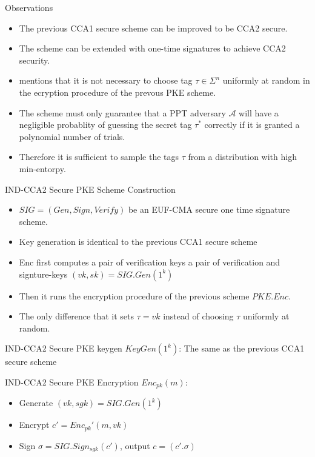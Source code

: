 \documentclass{beamer}
\begin{document}
\begin{frame}{Observations}
  \begin{itemize}
    \item The previous CCA1 secure scheme can be improved to be CCA2 secure.
    \item The scheme can be extended with one-time signatures to achieve CCA2 security.
    \item \cite{CCA} mentions that it is not necessary to choose tag $\tau \in \Sigma^n$ uniformly at random in the ecryption procedure of the prevous PKE scheme.
    \item The scheme must only guarantee that a PPT adversary $\mathcal{A}$ will have a negligible probablity of guessing the secret tag $\tau^*$ correctly if it is granted a polynomial number of trials.
    \item Therefore it is sufficient to sample the tags $\tau$ from a distribution with high min-entorpy.
  \end{itemize}

\end{frame}

\begin{frame}{IND-CCA2 Secure PKE Scheme Construction}
  \begin{itemize}
    \item $SIG = (Gen, Sign, Verify)$ be an EUF-CMA secure one time signature scheme.
    \item Key generation is identical to the previous CCA1 secure scheme
    \item Enc first computes a pair of verification keys a pair of verification and signture-keys $(vk, sk) = SIG.Gen(1^k)$
    \item Then it runs the encryption procedure of the previous scheme $PKE.Enc$.
    \item The only difference that it sets $\tau = vk$ instead of choosing $\tau$ uniformly at random.
  \end{itemize}
\end{frame}

\begin{frame}{IND-CCA2 Secure PKE keygen}
  $KeyGen(1^k)$:
  The same as the previous CCA1 secure scheme
\end{frame}

\begin{frame}{IND-CCA2 Secure PKE Encryption}
  $Enc_{pk}(m)$:
  \begin{itemize}
    \item Generate $(vk, sgk) = SIG.Gen(1^k)$
    \item Encrypt $c' = Enc_{pk}'(m, vk)$
    \item Sign $\sigma = SIG.Sign_{sgk}(c')$, output $c = (c'. \sigma)$
  \end{itemize}

\end{frame}
\end{document}
